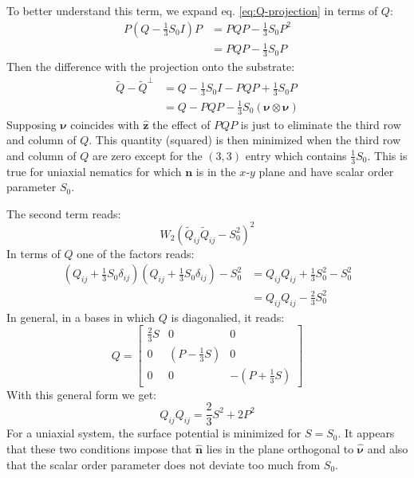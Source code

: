 \documentclass[reqno]{article}
\begin{document}
To better understand this term, we expand eq. \eqref{eq:Q-projection} in terms of $Q$:
\begin{equation}
\begin{split}
    P \left( Q - \frac13 S_0 I \right) P
    &=
    P Q P - \frac13 S_0 P^2 \\
    &= P Q P - \frac13 S_0 P
\end{split}
\end{equation}
Then the difference with the projection onto the substrate:
\begin{equation}
\begin{split}
    \tilde{Q} - \tilde{Q}^\perp
    &=
    Q - \frac13 S_0 I
    - PQP + \frac13 S_0 P \\
    &= Q - PQP - \frac13 S_0 \left( \boldsymbol{\nu} \otimes \boldsymbol{\nu} \right)
\end{split}
\end{equation}
Supposing $\boldsymbol{\nu}$ coincides with $\hat{\mathbf{z}}$ the effect of $PQP$ is just to eliminate the third row and column of $Q$.
This quantity (squared) is then minimized when the third row and column of $Q$ are zero except for the $(3, 3)$ entry which contains $\frac13 S_0$.
This is true for uniaxial nematics for which $\mathbf{n}$ is in the $x$-$y$ plane and have scalar order parameter $S_0$. 

The second term reads:
\begin{equation}
    W_2 \left(\tilde{Q}_{ij} \tilde{Q}_{ij} - S_0^2 \right)^2
\end{equation}
In terms of $Q$ one of the factors reads:
\begin{equation}
\begin{split}
    \left(Q_{ij} + \frac13 S_0 \delta_{ij}\right)\left(Q_{ij} + \frac13 S_0 \delta_{ij}\right)
    - S_0^2
    &=
    Q_{ij} Q_{ij} + \frac13 S_0^2 - S_0^2 \\
    &=
    Q_{ij} Q_{ij} - \tfrac23 S_0^2
\end{split}
\end{equation}
In general, in a bases in which $Q$ is diagonalied, it reads:
\begin{equation}
    Q
    =
    \begin{bmatrix}
    \frac23 S &0 &0 \\
    0 &\left(P - \frac13 S\right) &0 \\
    0 &0 &-\left(P + \frac13 S\right)
    \end{bmatrix}
\end{equation}
With this general form we get:
\begin{equation}
    Q_{ij} Q_{ij}
    =
    \frac23 S^2 + 2 P^2 
\end{equation}
For a uniaxial system, the surface potential is minimized for $S = S_0$.
It appears that these two conditions impose that $\mathbf{\hat{n}}$ lies in the plane orthogonal to $\boldsymbol{\hat{\nu}}$ and also that the scalar order parameter does not deviate too much from $S_0$.
\end{document}
